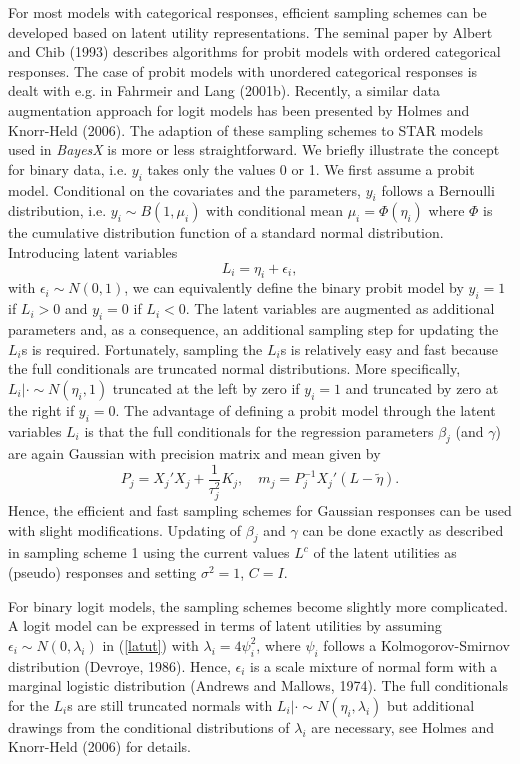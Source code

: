 \documentclass[11pt,a4paper,twoside]{bayesxarticle}
\begin{document}
For most models with categorical responses, efficient sampling
schemes can be developed based on latent utility representations.
The seminal paper by Albert and Chib (1993) describes algorithms for
probit models with ordered categorical responses. The case of probit
models with unordered categorical responses is dealt with e.g. in
Fahrmeir and Lang (2001b). Recently, a similar data augmentation
approach for logit models has been presented by Holmes and
Knorr-Held (2006). The adaption of these sampling schemes to STAR
models used in {\em BayesX} is more or less straightforward. We
briefly illustrate the concept for binary data, i.e. $y_i$ takes
only the values 0 or 1. We first assume a probit model. Conditional
on the covariates and the parameters, $y_i$ follows a Bernoulli
distribution, i.e. $y_i \sim B(1,\mu_i)$ with conditional mean
$\mu_i = \Phi(\eta_i)$ where $\Phi$ is the cumulative distribution
function of a standard normal distribution. Introducing latent
variables
\begin{equation}
\label{latut} L_i = \eta_i + \epsilon_i,
\end{equation}
with $\epsilon_i \sim N(0,1)$, we can equivalently define the binary
probit model by $y_i = 1$ if $L_i > 0$ and $y_i=0$ if $L_i < 0$. The
latent variables are augmented as additional parameters and, as a
consequence, an additional sampling step for updating the $L_i$s is
required. Fortunately, sampling the $L_i$s is relatively easy and
fast because the full conditionals are truncated normal
distributions. More specifically, $L_i | \cdot \sim N(\eta_i,1)$
truncated at the left by zero if $y_i=1$ and truncated by zero at
the right if $y_i=0$. The advantage of defining a probit model
through the latent variables $L_i$ is that the full conditionals for
the regression parameters $\beta_j$ (and $\gamma$) are again
Gaussian with precision matrix and mean given by
\begin{equation}
\label{prec2} P_j = X_j'X_j + \frac{1}{\tau^2_j}K_j, \quad m_j =
P_j^{-1}X_j'(L-\tilde{\eta}).
\end{equation}
Hence, the efficient and fast sampling schemes for Gaussian
responses can be used with slight modifications. Updating of
$\beta_j$ and $\gamma$ can be done exactly as described in
sampling scheme 1  using the current values $L^c$ of the latent
utilities as (pseudo) responses and setting $\sigma^2=1$, $C=I$.

For binary logit models, the sampling schemes become slightly more
complicated. A logit model can be expressed in terms of latent
utilities by assuming $\epsilon_i \sim N(0,\lambda_i)$ in
(\ref{latut}) with $\lambda_i = 4\psi_i^2$, where $\psi_i$ follows a
Kolmogorov-Smirnov distribution (Devroye, 1986). Hence, $\epsilon_i$
is  a scale mixture of normal form with a marginal logistic
distribution (Andrews and Mallows, 1974). The full conditionals for
the $L_i$s are still truncated normals with $L_i | \cdot \sim
N(\eta_i,\lambda_i)$ but additional drawings from the conditional
distributions of $\lambda_i$ are necessary, see Holmes and
Knorr-Held (2006) for details.
\end{document}
